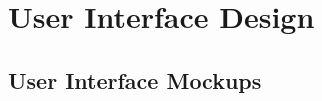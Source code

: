 \documentclass[../DD.tex]{subfiles}
\begin{document}
\chapter{User Interface Design}
\thispagestyle{fancy}
		 \section{User Interface Mockups}

		
\end{document}
